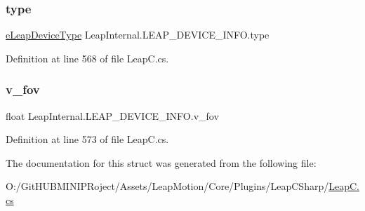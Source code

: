 \subsubsection{\texorpdfstring{type}{type}}
{\footnotesize\ttfamily \mbox{\hyperlink{namespace_leap_internal_a2f134f9672b8f6ded5ec9979abc7fe91}{e\+Leap\+Device\+Type}} Leap\+Internal.\+L\+E\+A\+P\+\_\+\+D\+E\+V\+I\+C\+E\+\_\+\+I\+N\+F\+O.\+type}



Definition at line 568 of file Leap\+C.\+cs.

\mbox{\label{struct_leap_internal_1_1_l_e_a_p___d_e_v_i_c_e___i_n_f_o_a016427490d1620736aa7c2c379378e15}} 
\subsubsection{\texorpdfstring{v\_fov}{v\_fov}}
{\footnotesize\ttfamily float Leap\+Internal.\+L\+E\+A\+P\+\_\+\+D\+E\+V\+I\+C\+E\+\_\+\+I\+N\+F\+O.\+v\+\_\+fov}



Definition at line 573 of file Leap\+C.\+cs.



The documentation for this struct was generated from the following file\+:\begin{DoxyCompactItemize}
\item 
O\+:/\+Git\+H\+U\+B\+M\+I\+N\+I\+P\+Roject/\+Assets/\+Leap\+Motion/\+Core/\+Plugins/\+Leap\+C\+Sharp/\mbox{\hyperlink{_leap_c_8cs}{Leap\+C.\+cs}}\end{DoxyCompactItemize}
